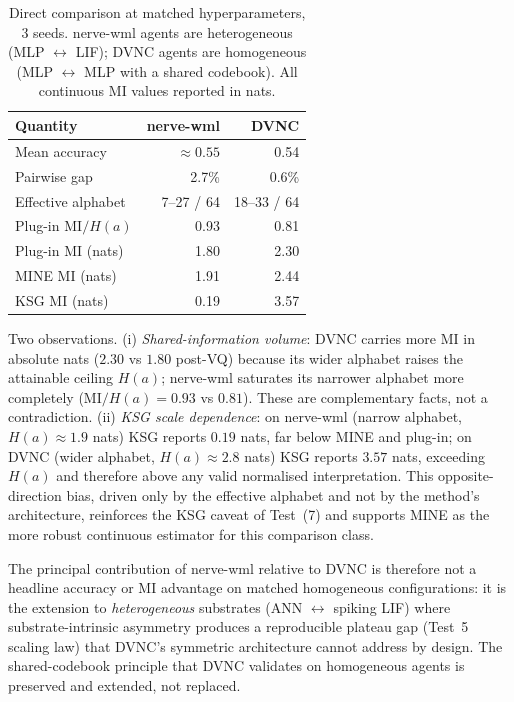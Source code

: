 \documentclass[10pt,twocolumn]{article}
\begin{document}
\begin{table}[t]
  \centering
  \caption{Direct comparison at matched hyperparameters, 3 seeds.
  nerve-wml agents are heterogeneous (MLP $\leftrightarrow$ LIF);
  DVNC agents are homogeneous (MLP $\leftrightarrow$ MLP with a
  shared codebook). All continuous MI values reported in nats.}
  \label{tab:dvnc-compare}
  \small
  \begin{tabular}{lrr}
    \hline
    Quantity & nerve-wml & DVNC \\
    \hline
    Mean accuracy           & $\approx 0.55$ & 0.54 \\
    Pairwise gap            & 2.7\%          & 0.6\% \\
    Effective alphabet      & 7--27 / 64     & 18--33 / 64 \\
    Plug-in $\mathrm{MI}/H(a)$ & 0.93        & 0.81 \\
    Plug-in MI (nats)       & 1.80           & 2.30 \\
    MINE MI (nats)          & 1.91           & 2.44 \\
    KSG MI (nats)           & 0.19           & 3.57 \\
    \hline
  \end{tabular}
\end{table}

Two observations. (i) \emph{Shared-information volume}: DVNC
carries more MI in absolute nats ($2.30$ vs $1.80$ post-VQ)
because its wider alphabet raises the attainable ceiling
$H(a)$; nerve-wml saturates its narrower alphabet more
completely ($\mathrm{MI}/H(a) = 0.93$ vs $0.81$). These are
complementary facts, not a contradiction. (ii) \emph{KSG scale
dependence}: on nerve-wml (narrow alphabet, $H(a) \approx 1.9$
nats) KSG reports $0.19$ nats, far below MINE and plug-in; on
DVNC (wider alphabet, $H(a) \approx 2.8$ nats) KSG reports
$3.57$ nats, exceeding $H(a)$ and therefore above any valid
normalised interpretation. This opposite-direction bias,
driven only by the effective alphabet and not by the method's
architecture, reinforces the KSG caveat of Test~(7) and
supports MINE as the more robust continuous estimator for this
comparison class.

The principal contribution of nerve-wml relative to DVNC is
therefore not a headline accuracy or MI advantage on matched
homogeneous configurations: it is the extension to
\emph{heterogeneous} substrates (ANN $\leftrightarrow$ spiking LIF)
where substrate-intrinsic asymmetry produces a reproducible
plateau gap (Test~5 scaling law) that DVNC's symmetric
architecture cannot address by design. The shared-codebook
principle that DVNC validates on homogeneous agents is
preserved and extended, not replaced.
\end{document}
